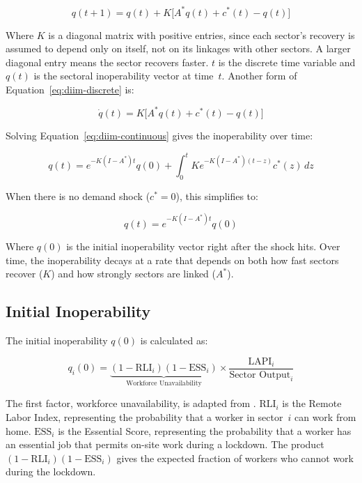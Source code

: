 \begin{equation}
    q(t+1) = q(t) + K \big[ A^{*} q(t) + c^{*}(t) - q(t) \big]
    \label{eq:diim-discrete}
\end{equation}

Where $K$ is a diagonal matrix with positive entries, since each sector's recovery is assumed to depend only on itself, not on its linkages with other sectors. A larger diagonal entry means the sector recovers faster. $t$ is the discrete time variable and $q(t)$ is the sectoral inoperability vector at time~$t$. Another form of Equation~\eqref{eq:diim-discrete} is:

\begin{equation}
    \label{eq:diim-continuous}
    \dot{q}(t) = K \bigl[ A^{*} q(t) + c^{*}(t) - q(t) \bigr]
\end{equation}

Solving Equation~\eqref{eq:diim-continuous} gives the inoperability over time:

\begin{equation}
    q(t) = e^{-K(I-A^{*})t} q(0) + \int_{0}^{t} K e^{-K(I-A^{*})(t-z)} c^{*}(z)\, dz
    \label{eq:diim-solution-general}
\end{equation}

When there is no demand shock ($c^{*}=0$), this simplifies to:

\begin{equation}
    q(t) = e^{-K (I - A^{*}) t} q(0)
    \label{eq:diim-solution-homogeneous}
\end{equation}

Where $q(0)$ is the initial inoperability vector right after the shock hits. Over time, the inoperability decays at a rate that depends on both how fast sectors recover ($K$) and how strongly sectors are linked ($A^{*}$).

\subsection{Initial Inoperability}

The initial inoperability $q(0)$ is calculated as:

\begin{equation}
    \label{eq:initial-inoperability}
    q_i(0) = \underbrace{\left(1 - \text{RLI}_i\right)\left(1 - \text{ESS}_i\right)}_{\text{Workforce Unavailability}} \times \frac{\text{LAPI}_i}{\text{Sector Output}_i}
\end{equation}

The first factor, workforce unavailability, is adapted from \cite{DelRioChanona2020,Pichler2022}. $\text{RLI}_i$ is the Remote Labor Index, representing the probability that a worker in sector~$i$ can work from home. $\text{ESS}_i$ is the Essential Score, representing the probability that a worker has an essential job that permits on-site work during a lockdown. The product $(1-\text{RLI}_i)(1-\text{ESS}_i)$ gives the expected fraction of workers who cannot work during the lockdown.

